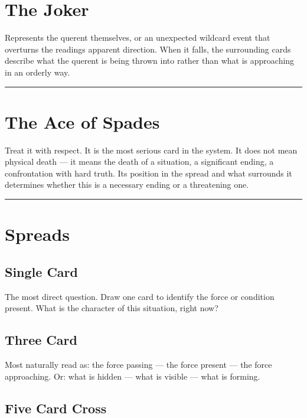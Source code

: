 \section{The Joker}\label{the-joker}

Represents the querent themselves, or an unexpected wildcard event that overturns the reading\textquotesingle s apparent direction. When it falls, the surrounding cards describe what the querent is being thrown into rather than what is approaching in an orderly way.

\begin{center}\rule{0.5\linewidth}{0.5pt}\end{center}

\section{The Ace of Spades}\label{the-ace-of-spades}

Treat it with respect. It is the most serious card in the system. It does not mean physical death --- it means the death of a situation, a significant ending, a confrontation with hard truth. Its position in the spread and what surrounds it determines whether this is a necessary ending or a threatening one.

\begin{center}\rule{0.5\linewidth}{0.5pt}\end{center}

\section{Spreads}\label{spreads}

\subsection{Single Card}\label{single-card}

The most direct question. Draw one card to identify the force or condition present. What is the character of this situation, right now?

\subsection{Three Card}\label{three-card}

Most naturally read as: the force passing --- the force present --- the force approaching. Or: what is hidden --- what is visible --- what is forming.

\subsection{Five Card Cross}\label{five-card-cross}

